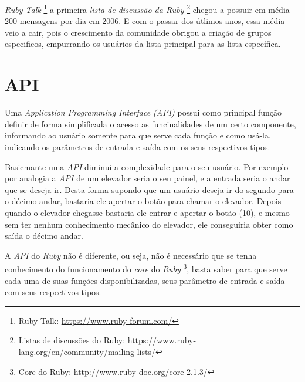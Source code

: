 \emph{Ruby-Talk} \footnote{Ruby-Talk: \url{https://www.ruby-forum.com/}} a primeira \emph{lista de
discussão da Ruby} \footnote{Listas de discussões do Ruby:
\url{https://www.ruby-lang.org/en/community/mailing-lists/}} chegou a possuir em média 200 mensagens por dia
em 2006. E com o passar dos útlimos anos, essa média veio a cair, pois o crescimento da comunidade
obrigou a criação de grupos especificos, empurrando os usuários da lista principal para as lista específica.


\section{API}
\label{API}

Uma \emph{Application Programming Interface (API)} possui como principal função definir de forma simplificada
o acesso as funcinalidades de um certo componente, informando ao usuário somente para que serve cada função
e como usá-la, indicando os parâmetros de entrada e saída com os seus respectivos tipos.

Basicmante uma \emph{API} diminui a complexidade para o seu usuário. Por exemplo por analogia a \emph{API}
de um elevador seria o seu painel, e a entrada seria o andar que se deseja ir. Desta forma supondo que
um usuário deseja ir do segundo para o décimo andar, bastaria ele apertar o botão para chamar o
elevador. Depois quando o elevador chegasse bastaria ele entrar e apertar o botão (10), e mesmo sem ter
nenhum conhecimento mecânico do elevador, ele conseguiria obter como saída o décimo andar.

A \emph{API} do \emph{Ruby} não é diferente, ou seja, não é necessário que se tenha
conhecimento do funcionamento do \emph{core} do \emph{Ruby}
\footnote{ Core do Ruby: \url{http://www.ruby-doc.org/core-2.1.3/}}, basta saber para que
serve cada uma de suas funções disponibilizadas, seus parâmetro de entrada e saída com seus respectivos tipos.